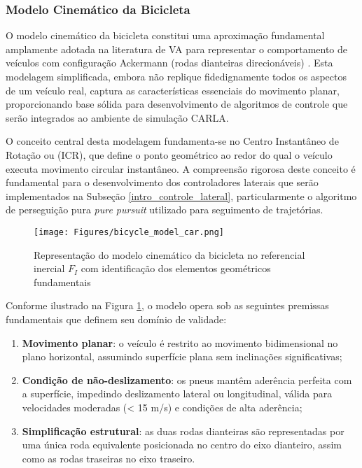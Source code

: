 \subsubsection{Modelo Cinemático da Bicicleta} \label{bicicleta}

O modelo cinemático da bicicleta constitui uma aproximação fundamental amplamente adotada na literatura de VA para representar o comportamento de veículos com configuração Ackermann (rodas dianteiras direcionáveis) \cite{francis2016models}. Esta modelagem simplificada, embora não replique fidedignamente todos os aspectos de um veículo real, captura as características essenciais do movimento planar, proporcionando base sólida para desenvolvimento de algoritmos de controle que serão integrados ao ambiente de simulação CARLA.

O conceito central desta modelagem fundamenta-se no Centro Instantâneo de Rotação ou (ICR), que define o ponto geométrico ao redor do qual o veículo executa movimento circular instantâneo. A compreensão rigorosa deste conceito é fundamental para o desenvolvimento dos controladores laterais que serão implementados na Subseção \ref{intro_controle_lateral}, particularmente o algoritmo de perseguição pura \textit{pure pursuit} utilizado para seguimento de trajetórias.

\begin{figure}[H]
\centering
\texttt{[image: Figures/bicycle\_model\_car.png]}
\caption{Representação do modelo cinemático da bicicleta no referencial inercial $F_I$ com identificação dos elementos geométricos fundamentais \cite{University_of_Toronto2018-fe}}
\label{FI}
\end{figure}

Conforme ilustrado na Figura \ref{FI}, o modelo opera sob as seguintes premissas fundamentais que definem seu domínio de validade:

\begin{enumerate}
\item \textbf{Movimento planar}: o veículo é restrito ao movimento bidimensional no plano horizontal, assumindo superfície plana sem inclinações significativas;
\item \textbf{Condição de não-deslizamento}: os pneus mantêm aderência perfeita com a superfície, impedindo deslizamento lateral ou longitudinal, válida para velocidades moderadas (< 15 m/s) e condições de alta aderência;
\item \textbf{Simplificação estrutural}: as duas rodas dianteiras são representadas por uma única roda equivalente posicionada no centro do eixo dianteiro, assim como as rodas traseiras no eixo traseiro.
\end{enumerate}

